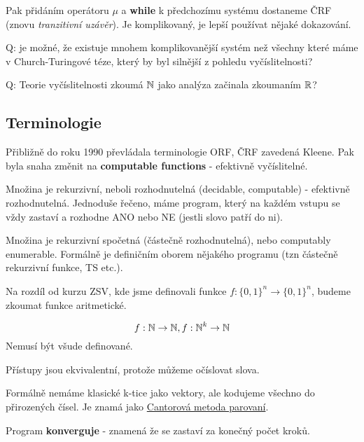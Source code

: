 \begin{note}
	Pak přidáním operátoru $\mu$ a \textbf{while} k předchozímu systému dostaneme ČRF (znovu \emph{tranzitivní uzávěr}).
	Je komplikovaný, je lepší používat nějaké dokazování.
\end{note}

Q: je možné, že existuje mnohem komplikovanější systém než všechny které máme v Church-Turingové téze, který by byl silnější z pohledu vyčíslitelnosti?

Q: Teorie vyčíslitelnosti zkoumá $\operatorname{\mathbb{N}}$ jako analýza začinala zkoumaním $\operatorname{\mathbb{R}}$?

\subsection{Terminologie}

Přibližně do roku 1990 převládala terminologie ORF, ČRF zavedená Kleene.
Pak byla snaha změnit na \textbf{computable functions} - efektivně vyčíslitelné.
\begin{definition}
	Množina je rekurzivní, neboli rozhodnutelná (decidable, computable) - efektivně rozhodnutelná.
	Jednoduše řečeno, máme program, který na každém vstupu se vždy zastaví a rozhodne ANO nebo NE (jestli slovo patří do ni).
\end{definition}

\begin{definition}
	Množina je rekurzivní spočetná (částečně rozhodnutelná), nebo computably enumerable.
	Formálně je definičním oborem nějakého programu (tzn částečně rekurzivní funkce, TS etc.).
\end{definition}

\begin{note}
	Na rozdíl od kurzu ZSV, kde jsme definovali funkce $f:\{0, 1\}^n \to \{0, 1\}^n$,
	budeme zkoumat funkce aritmetické.

	\[ f:\operatorname{\mathbb{N}} \to \operatorname{\mathbb{N}}, f:\operatorname{\mathbb{N}}^k \to \operatorname{\mathbb{N}} \]
	Nemusí být všude definované.

	Přístupy jsou ekvivalentní, protože můžeme očíslovat slova.
\end{note}

\begin{note}
	Formálně nemáme klasické k-tice jako vektory, ale kodujeme všechno do přirozených čísel.
	Je znamá jako \href{https://en.wikipedia.org/wiki/Pairing_function}{Cantorová metoda parovaní}.
\end{note}

\begin{notation}
	Program \textbf{konverguje} - znamená že se zastaví za konečný počet kroků.
\end{notation}

